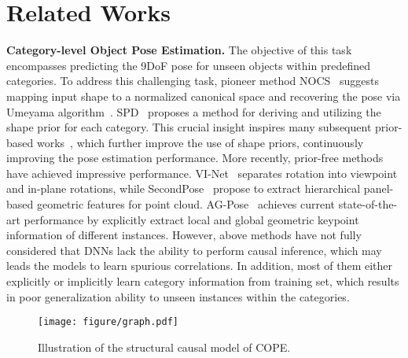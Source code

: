 \section{Related Works}
\label{sec:relate_works}
\noindent
{\bf Category-level Object Pose Estimation.} The objective of this task encompasses predicting the 9DoF pose for unseen objects within predefined categories.
To address this challenging task, pioneer method NOCS~\cite{wang2019normalized} suggests mapping input shape to a normalized canonical space and recovering the pose via Umeyama algorithm~\cite{umeyama1991least}. 
SPD~\cite{tian2020shape} proposes a method for deriving and utilizing the shape prior for each category. This crucial insight inspires many subsequent prior-based works~\cite{lin2022sar,fan2021acr}, which further improve the use of shape priors, continuously improving the pose estimation performance.
More recently, prior-free methods~\cite{di2022gpv,zheng2023hs,lin2023vi,chen2024secondpose,lin2024instance} have achieved impressive performance.
VI-Net~\cite{lin2023vi} separates rotation into viewpoint and in-plane rotations, while SecondPose~\cite{chen2024secondpose} propose to extract hierarchical panel-based geometric features for point cloud.
AG-Pose~\cite{lin2024instance} achieves current state-of-the-art performance by explicitly extract local and global geometric keypoint information of different instances.
However, above methods have not fully considered that DNNs lack the ability to perform causal inference, which may leads the models to learn spurious correlations.
In addition, most of them either explicitly or implicitly learn category information from training set, which results in poor generalization ability to unseen instances within the categories.

\begin{figure}[htbp]
\centering
\texttt{[image: figure/graph.pdf]}
   \caption{Illustration of the structural causal model of COPE.
   }
   \vspace{-0.4cm}
   \label{fig:causal_model}
\end{figure}

